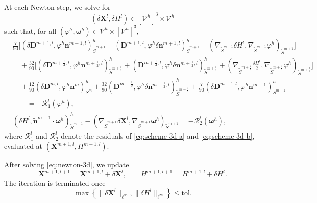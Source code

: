 \documentclass[smallextended]{svjour3}
\numberwithin{equation}{section}
\begin{document}
	At each Newton step, we solve for
	\[
	(\delta\mathbf{X}^{l},\delta H^{l})\in[\mathcal V^h]^3\times\mathcal V^h
	\]
	such that, for all $(\varphi^h,\boldsymbol{\omega}^h)\in\mathcal V^h\times[\mathcal V^h]^3$,
	\begin{subequations}
		\label{eq:newton-3d}
		\begin{align}
			&
			\frac{7}{90}
			\Bigg[
			\left(
			\delta\mathbf{D}^{m+1,l},
			\varphi^h\mathbf{n}^{m+1,l}
			\right)^h_{\widetilde{S}^{m+1}}
			+
			\left(
			\mathbf{D}^{m+1,l},
			\varphi^h\delta\mathbf{n}^{m+1,l}
			\right)^h_{\widetilde{S}^{m+1}}
			+
			\left(
			\nabla_{\widetilde{S}^{m+1}}\delta H^{l},
			\nabla_{\widetilde{S}^{m+1}}\varphi^h
			\right)_{\widetilde{S}^{m+1}}
			\Bigg]
			\nonumber\\
			&\quad
			+
			\frac{32}{90}
			\Bigg[
			\left(
			\delta\mathbf{D}^{m+\frac12,l},
			\varphi^h\mathbf{n}^{m+\frac12,l}
			\right)^h_{\widetilde{S}^{m+\frac12}}
			+
			\left(
			\mathbf{D}^{m+\frac12,l},
			\varphi^h\delta\mathbf{n}^{m+\frac12,l}
			\right)^h_{\widetilde{S}^{m+\frac12}}
			+
			\left(
			\nabla_{\widetilde{S}^{m+\frac12}}\frac{\delta H^{l}}{2},
			\nabla_{\widetilde{S}^{m+\frac12}}\varphi^h
			\right)_{\widetilde{S}^{m+\frac12}}
			\Bigg]
			\nonumber\\
			&\quad
			+
			\frac{12}{90}
			\left(
			\delta\mathbf{D}^{m,l},
			\varphi^h\mathbf{n}^{m}
			\right)^h_{S^{m}}
			+
			\frac{32}{90}
			\left(
			\mathbf{D}^{m-\frac12},
			\varphi^h\delta\mathbf{n}^{m-\frac12,l}
			\right)^h_{\widetilde{S}^{m-\frac12}}
			+
			\frac{7}{90}
			\left(
			\delta\mathbf{D}^{m-1,l},
			\varphi^h\mathbf{n}^{m-1}
			\right)^h_{S^{m-1}}
			\nonumber\\
			&\qquad
			=
			-\mathcal{R}_1^{l}(\varphi^h),
			\label{eq:newton-3d-a}
			\\
			&
			\left(
			\delta H^{l},
			\widetilde{\mathbf{n}}^{m+1}\cdot\boldsymbol{\omega}^h
			\right)^h_{\widetilde{S}^{m+1}}
			-
			\left(
			\nabla_{\widetilde{S}^{m+1}}\delta\mathbf{X}^{l},
			\nabla_{\widetilde{S}^{m+1}}\boldsymbol{\omega}^h
			\right)_{\widetilde{S}^{m+1}}
			=
			-\mathcal{R}_2^{l}(\boldsymbol{\omega}^h),
			\label{eq:newton-3d-b}
		\end{align}
	\end{subequations}
	where $\mathcal{R}_1^l$ and $\mathcal{R}_2^l$ denote the residuals of \eqref{eq:scheme-3d-a} and \eqref{eq:scheme-3d-b}, evaluated at $(\mathbf{X}^{m+1,l},H^{m+1,l})$.
	
	After solving \eqref{eq:newton-3d}, we update
	\[
	\mathbf{X}^{m+1,l+1}
	=
	\mathbf{X}^{m+1,l}+\delta\mathbf{X}^{l},
	\qquad
	H^{m+1,l+1}
	=
	H^{m+1,l}+\delta H^{l}.
	\]
	The iteration is terminated once
	\[
	\max\left\{
	\|\delta\mathbf{X}^{l}\|_{\ell^\infty},
	\|\delta H^{l}\|_{\ell^\infty}
	\right\}
	\le \mathrm{tol}.
	\]
	
\end{document}

